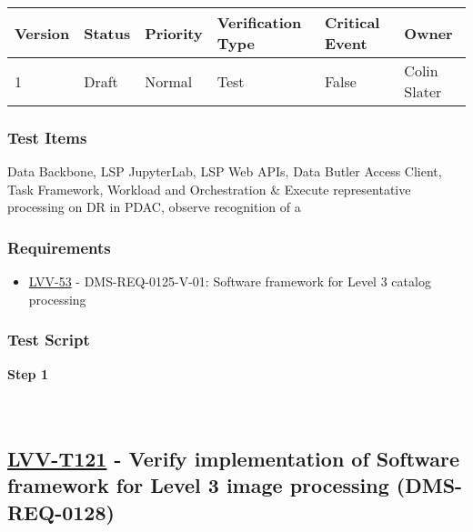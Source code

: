 \begin{longtable}[]{@{}llllll@{}}
\toprule
Version & Status & Priority & Verification Type & Critical Event &
Owner\tabularnewline
\midrule
\endhead
1 & Draft & Normal & Test & False & Colin Slater\tabularnewline
\bottomrule
\end{longtable}

\hypertarget{test-items-20}{%
\subsubsection{Test Items}\label{test-items-20}}

Data Backbone, LSP JupyterLab, LSP Web APIs, Data Butler Access Client,
Task Framework, Workload and Orchestration \& Execute representative
processing on DR in PDAC, observe recognition of a

\hypertarget{requirements-20}{%
\subsubsection{Requirements}\label{requirements-20}}

\begin{itemize}
\tightlist
\item
  \href{https://jira.lsstcorp.org/browse/LVV-53}{LVV-53} -
  DMS-REQ-0125-V-01: Software framework for Level 3 catalog processing
\end{itemize}

\hypertarget{test-script-20}{%
\subsubsection{Test Script}\label{test-script-20}}

\textbf{Step 1}\\
~\\
~\\

\hypertarget{lvv-t121---verify-implementation-of-software-framework-for-level-3-image-processing-dms-req-0128}{%
\subsection{\texorpdfstring{\href{https://jira.lsstcorp.org/secure/Tests.jspa\#/testCase/LVV-T121}{LVV-T121}
- Verify implementation of Software framework for Level 3 image
processing
(DMS-REQ-0128)}{LVV-T121 - Verify implementation of Software framework for Level 3 image processing (DMS-REQ-0128)}}\label{lvv-t121---verify-implementation-of-software-framework-for-level-3-image-processing-dms-req-0128}}


